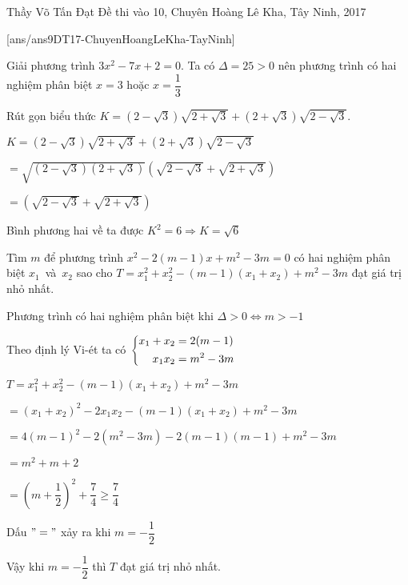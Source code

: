 \begin{name}
{Thầy  Võ Tấn Đạt}
{Đề thi vào 10, Chuyên Hoàng Lê Kha, Tây Ninh, 2017}
\end{name}
\setcounter{ex}{0}
[ans/ans9DT17-ChuyenHoangLeKha-TayNinh]
\begin{ex}%
    Giải phương trình $3x^2 -7x +2=0$.
\loigiai
    {
    Ta có $\Delta = 25 >0$ nên phương trình có hai nghiệm phân biệt $x=3$ hoặc $x=\dfrac{1}{3}$  
    }
\end{ex}

\begin{ex}%
Rút gọn biểu thức $K=(2-\sqrt{3})\sqrt{2+\sqrt{3}}+(2+\sqrt{3})\sqrt{2-\sqrt{3}}$.
\loigiai
    {
    	
    	$K=(2-\sqrt{3})\sqrt{2+\sqrt{3}}+(2+\sqrt{3})\sqrt{2-\sqrt{3}}$
    	
    	$=\sqrt{(2-\sqrt{3})(2+\sqrt{3})}(\sqrt{2-\sqrt{3}}+\sqrt{2+\sqrt{3}})$
    	
    	$=(\sqrt{2-\sqrt{3}}+\sqrt{2+\sqrt{3}}) $
    
    Bình phương hai về  ta được $K^2=6 \Rightarrow K=\sqrt{6}$
    
}
\end{ex}

\begin{ex}%
Tìm $m$ để phương trình $x^2-2(m-1)x+m^2-3m=0 $ có hai nghiệm	 phân biệt $x_1$~và~$x_2$ sao cho $T=x_1^2+x_2^2 -(m-1)(x_1+x_2)+m^2-3m$ đạt giá trị nhỏ nhất.
    
\loigiai
    { Phương trình có hai nghiệm phân biệt khi $\Delta > 0 \Leftrightarrow m>-1  $
    	
    Theo định lý Vi-ét  ta có $\left\{\begin{aligned}x_1+x_2&=2(m-1)\\x_1x_2&=m^2-3m\end{aligned}\right.$
    
    $T=x_1^2+x_2^2 -(m-1)(x_1+x_2)+m^2-3m$
    
    $=(x_1+x_2)^2 -2x_1x_2 -(m-1)(x_1+x_2)+m^2-3m$
    
    $=4(m-1)^2-2(m^2-3m)-2(m-1)(m-1)+m^2-3m$
    
    $=m^2+m+2$
    
    $=\left(m+\dfrac{1}{2}\right)^2+\dfrac{7}{4} \geq \dfrac{7}{4}$
    
    Dấu $"="$ xảy ra khi $m=-\dfrac{1}{2}$
    
    Vậy khi $m=-\dfrac{1}{2}$ thì $T$ đạt giá trị nhỏ nhất. 
    
    }
\end{ex}

